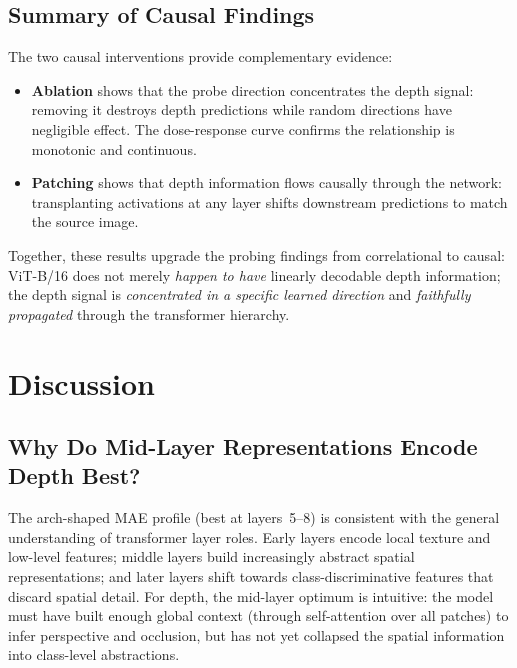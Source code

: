 \documentclass[11pt,a4paper]{article}
\begin{document}
\subsection{Summary of Causal Findings}

The two causal interventions provide complementary evidence:
\begin{itemize}[noitemsep]
    \item \textbf{Ablation} shows that the probe direction concentrates
          the depth signal: removing it destroys depth predictions while
          random directions have negligible effect.  The dose-response curve
          confirms the relationship is monotonic and continuous.
    \item \textbf{Patching} shows that depth information flows causally
          through the network: transplanting activations at any layer
          shifts downstream predictions to match the source image.
\end{itemize}
Together, these results upgrade the probing findings from correlational to
causal: ViT-B/16 does not merely \emph{happen to have} linearly decodable
depth information; the depth signal is \emph{concentrated in a specific
learned direction} and \emph{faithfully propagated} through the transformer
hierarchy.

\section{Discussion}
\label{sec:discussion}

\subsection{Why Do Mid-Layer Representations Encode Depth Best?}

The arch-shaped MAE profile (best at layers~5--8) is consistent with the
general understanding of transformer layer roles.  Early layers encode
local texture and low-level features; middle layers build increasingly
abstract spatial representations; and later layers shift towards
class-discriminative features that discard spatial detail.  For depth, the
mid-layer optimum is intuitive: the model must have built enough global
context (through self-attention over all patches) to infer perspective and
occlusion, but has not yet collapsed the spatial information into
class-level abstractions.
\end{document}
